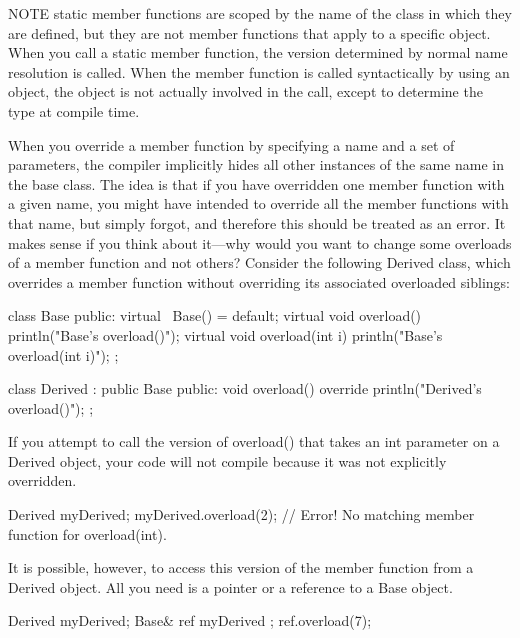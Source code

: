 \begin{myNotic}{NOTE}
static member functions are scoped by the name of the class in which they are defined, but they are not member functions that apply to a specific object. When you call a static member function, the version determined by normal name resolution is called. When the member function is called syntactically by using an object, the object is not actually involved in the call, except to determine the type at compile time.
\end{myNotic}


When you override a member function by specifying a name and a set of parameters, the compiler implicitly hides all other instances of the same name in the base class. The idea is that if you have overridden one member function with a given name, you might have intended to override all the member functions with that name, but simply forgot, and therefore this should be treated as an error. It makes sense if you think about it—why would you want to change some overloads of a member function and not others? Consider the following Derived class, which overrides a member function without overriding its associated overloaded siblings:

\begin{cpp}
class Base
{
    public:
        virtual ~Base() = default;
        virtual void overload() { println("Base's overload()"); }
        virtual void overload(int i) { println("Base's overload(int i)"); }
};

class Derived : public Base
{
    public:
        void overload() override { println("Derived's overload()"); }
};
\end{cpp}

If you attempt to call the version of overload() that takes an int parameter on a Derived object, your code will not compile because it was not explicitly overridden.

\begin{cpp}
Derived myDerived;
myDerived.overload(2); // Error! No matching member function for overload(int).
\end{cpp}

It is possible, however, to access this version of the member function from a Derived object. All you need is a pointer or a reference to a Base object.

\begin{cpp}
Derived myDerived;
Base& ref { myDerived };
ref.overload(7);
\end{cpp}

